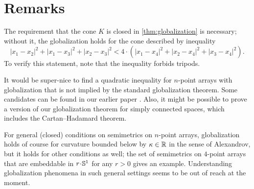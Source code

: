 \documentclass[a4paper,10pt]{article}
\begin{document}
\section{Remarks}

The requirement that the cone $K$ is closed in \ref{thm:globalization} is necessary;
without it, the globalization holds for the cone described by inequality
\[|x_1-x_2|^2+|x_1-x_3|^2+|x_2-x_3|^2<4\cdot(|x_1-x_4|^2+|x_2-x_4|^2+|x_3-x_4|^2).\]
To verify this statement, note that the inequality forbids tripods.

It would be super-nice to find a quadratic inequality for $n$-point arrays with globalization that is not implied by the standard globalization theorem.
Some candidates can be found in our earlier paper \cite{lebedeva-petrunin-zolotov}.
Also, it might be possible to prove a version of our globalization theorem
for simply connected spaces, which includes the Cartan--Hadamard theorem.

For general (closed) conditions on semimetrics on $n$-point arrays, globalization holds of course for curvature bounded below by $\kappa\in \mathbb{R}$ in the sense of Alexandrov,
but it holds for other conditions as well;
the set of semimetrics on $4$-point arrays that are embeddable in $r\cdot\SSS^1$ for any $r>0$ gives an example.
Understanding globalization phenomena in such general settings seems to be out of reach at the moment.

{\sloppy
\def\emph{\textit}
\printbibliography[heading=bibintoc]
\fussy
}
\end{document}
